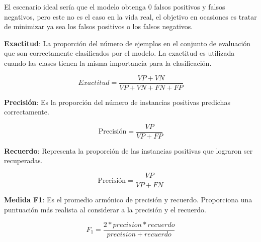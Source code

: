 El escenario ideal sería que el modelo obtenga $0$ falsos positivos y falsos negativos, pero este no es el caso en la vida real, el objetivo en ocasiones es tratar de minimizar ya sea los falsos positivos o los falsos negativos.

\textbf{Exactitud}: La proporción del número de ejemplos en el conjunto de evaluación que son correctamente clasificados por el modelo. La exactitud es utilizada cuando las clases tienen la misma importancia para la clasificación.

\begin{equation} \label{eq:acc}
Exactitud = \frac{VP + VN}{VP + VN+ FN+FP}    
\end{equation}

\textbf{Precisión}: Es la proporción del número de instancias positivas predichas correctamente.

\begin{equation} \label{eq:precc}
\text{Precisión} = \frac{VP}{VP+FP}    
\end{equation}

\textbf{Recuerdo}: Representa la proporción de las instancias positivas que lograron ser recuperadas.

\begin{equation} \label{eq:recc}
\text{Precisión} = \frac {VP}{VP+FN}    
\end{equation}

\textbf{Medida F1}: Es el promedio armónico de precisión y recuerdo. Proporciona una puntuación más realista al considerar a la precisión y el recuerdo.

\begin{equation} \label{eq:f1}
F_1= \frac{2 * precision * recuerdo}{precision+recuerdo}   
\end{equation}